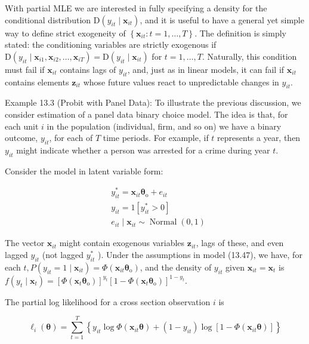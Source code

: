 \documentclass[10pt]{article}
\begin{document}
With partial MLE we are interested in fully specifying a density for the conditional distribution $\mathrm{D}\left(y_{i t} \mid \mathbf{x}_{i t}\right)$, and it is useful to have a general yet simple way to define strict exogeneity of $\left\{\mathbf{x}_{i t}: t=1, \ldots, T\right\}$. The definition is simply stated: the conditioning variables are strictly exogenous if $\mathrm{D}\left(y_{i t} \mid \mathbf{x}_{i 1}, \mathbf{x}_{i 2}, \ldots, \mathbf{x}_{i T}\right)=\mathrm{D}\left(y_{i t} \mid \mathbf{x}_{i t}\right)$ for $t=1, \ldots, T$. Naturally, this condition must fail if $\mathbf{x}_{i t}$ contains lags of $y_{i t}$, and, just as in linear models, it can fail if $\mathbf{x}_{i t}$ contains elements $\mathbf{z}_{i t}$ whose future values react to unpredictable changes in $y_{i t}$.

Example 13.3 (Probit with Panel Data): To illustrate the previous discussion, we consider estimation of a panel data binary choice model. The idea is that, for each unit $i$ in the population (individual, firm, and so on) we have a binary outcome, $y_{i t}$, for each of $T$ time periods. For example, if $t$ represents a year, then $y_{i t}$ might indicate whether a person was arrested for a crime during year $t$.

Consider the model in latent variable form:


\begin{align*}
& y_{i t}^{*}=\mathbf{x}_{i t} \boldsymbol{\theta}_{\mathrm{o}}+e_{i t} \\
& y_{i t}=1\left[y_{i t}^{*}>0\right]  \tag{13.47}\\
& e_{i t} \mid \mathbf{x}_{i t} \sim \operatorname{Normal}(0,1)
\end{align*}


The vector $\mathbf{x}_{i t}$ might contain exogenous variables $\mathbf{z}_{i t}$, lags of these, and even lagged $y_{i t}$ (not lagged $y_{i t}^{*}$ ). Under the assumptions in model (13.47), we have, for each $t, P\left(y_{i t}=1 \mid \mathbf{x}_{i t}\right)=\Phi\left(\mathbf{x}_{i t} \boldsymbol{\theta}_{\mathrm{o}}\right)$, and the density of $y_{i t}$ given $\mathbf{x}_{i t}=\mathbf{x}_{t}$ is $f\left(y_{t} \mid \mathbf{x}_{t}\right)= \left[\Phi\left(\mathbf{x}_{t} \boldsymbol{\theta}_{\mathrm{o}}\right)\right]^{y_{t}}\left[1-\Phi\left(\mathbf{x}_{t} \boldsymbol{\theta}_{\mathrm{o}}\right)\right]^{1-y_{t}}$.

The partial log likelihood for a cross section observation $i$ is


\begin{equation*}
\ell_{i}(\boldsymbol{\theta})=\sum_{t=1}^{T}\left\{y_{i t} \log \Phi\left(\mathbf{x}_{i t} \boldsymbol{\theta}\right)+\left(1-y_{i t}\right) \log \left[1-\Phi\left(\mathbf{x}_{i t} \boldsymbol{\theta}\right)\right]\right\} \tag{13.48}
\end{equation*}
\end{document}
